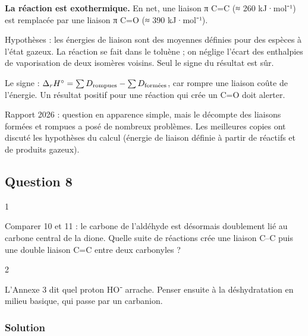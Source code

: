 \documentclass[11pt,a4paper]{article}
\newcommand{\equationajustee}[1]{%
  \sbox{\boiteequation}{$\displaystyle #1$}%
  \ifdim\wd\boiteequation>\linewidth
    \[\resizebox{\linewidth}{!}{\usebox{\boiteequation}}\]%
  \else
    \[#1\]%
  \fi}
\begin{document}
\equationajustee{\Delta_rH^\circ\approx2270-2400=\boxed{-130\ \mathrm{kJ\cdot mol^{-1}}}}

\textbf{La réaction est exothermique.} En net, une liaison π C=C (≈ 260 kJ·mol⁻¹) est remplacée par une liaison π C=O (≈ 390 kJ·mol⁻¹).

Hypothèses : les énergies de liaison sont des moyennes définies pour des espèces à l'état gazeux. La réaction se fait dans le toluène ; on néglige l'écart des enthalpies de vaporisation de deux isomères voisins. Seul le signe du résultat est sûr.

\begin{piege}

Le signe : \(\Delta_rH^\circ=\sum D_{\text{rompues}}-\sum D_{\text{\text{formées}}}\), car rompre une liaison coûte de l'énergie. Un résultat positif pour une réaction qui crée un C=O doit alerter.

\end{piege}

\begin{jury}

Rapport 2026 : question en apparence simple, mais le décompte des liaisons formées et rompues a posé de nombreux problèmes. Les meilleures copies ont discuté les hypothèses du calcul (énergie de liaison définie à partir de réactifs et de produits gazeux).

\end{jury}

\hypertarget{question-8}{%
\subsection{Question 8}\label{question-8}}

\begin{indication}{1}

Comparer 10 et 11 : le carbone de l'aldéhyde est désormais doublement lié au carbone central de la dione. Quelle suite de réactions crée une liaison C--C puis une double liaison C=C entre deux carbonyles ?

\end{indication}

\begin{indication}{2}

L'Annexe 3 dit quel proton HO⁻ arrache. Penser ensuite à la déshydratation en milieu basique, qui passe par un carbanion.

\end{indication}

\hypertarget{solution-7}{%
\subsubsection{Solution}\label{solution-7}}
\end{document}
